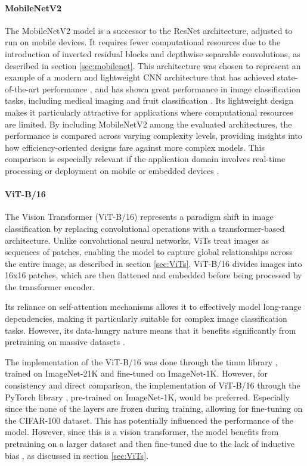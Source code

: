 \paragraph{MobileNetV2}
The MobileNetV2 model  is a successor to the ResNet architecture, adjusted to run on mobile devices. It requires fewer computational resources due to the introduction of inverted residual blocks and depthwise separable convolutions, as described in section \ref{sec:mobilenet}. This architecture was chosen to represent an example of a modern and lightweight CNN architecture that has achieved state-of-the-art performance \cite{sandler2018mobilenetv2}, and has shown great performance in image classification tasks, including medical imaging \cite{surya2024enhancedbreastcancertumor} and fruit classification \cite{10112802, shahi2022fruit}. Its lightweight design makes it particularly attractive for applications where computational resources are limited. By including MobileNetV2 among the evaluated architectures, the performance is compared across varying complexity levels, providing insights into how efficiency-oriented designs fare against more complex models. This comparison is especially relevant if the application domain involves real-time processing or deployment on mobile or embedded devices \cite{sandler2018mobilenetv2}. 


\paragraph{ViT-B/16}
The Vision Transformer (ViT-B/16) \cite{dosovitskiy2021imageworth16x16words} represents a paradigm shift in image classification by replacing convolutional operations with a transformer-based architecture. Unlike convolutional neural networks, ViTs treat images as sequences of patches, enabling the model to capture global relationships across the entire image, as described in section \ref{sec:ViTs}. ViT-B/16 divides images into 16x16 patches, which are then flattened and embedded before being processed by the transformer encoder.

Its reliance on self-attention mechanisms allows it to effectively model long-range dependencies, making it particularly suitable for complex image classification tasks. However, its data-hungry nature means that it benefits significantly from pretraining on massive datasets \cite{dosovitskiy2021imageworth16x16words}.

The implementation of the ViT-B/16 was done through the timm library \cite{huggingface2024vitbase}, trained on ImageNet-21K and fine-tuned on ImageNet-1K. However, for consistency and direct comparison, the implementation of ViT-B/16 through the PyTorch library \cite{torchvision2024vitb16}, pre-trained on ImageNet-1K, would be preferred. Especially since the none of the layers are frozen during training, allowing for fine-tuning on the CIFAR-100 dataset. This has potentially influenced the performance of the model. However, since this is a vision transformer, the model benefits from pretraining on a larger dataset and then fine-tuned due to the lack of inductive bias \cite{dosovitskiy2021imageworth16x16words,kolesnikov2020bigtransferbitgeneral}, as discussed in section \ref{sec:ViTs}.

